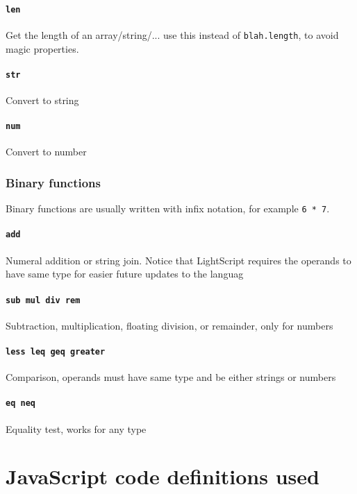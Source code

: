 \documentclass[10pt]{article}
\begin{document}
\paragraph{\tt len} Get the length of an array/string/... use this instead of \verb|blah.length|, to avoid magic properties.
\paragraph{\tt str} Convert to string
\paragraph{\tt num} Convert to number
\subsubsection{Binary functions}
Binary functions are usually written with infix notation, for example \verb|6 * 7|.
\paragraph{\tt add} Numeral addition or string join. Notice that LightScript requires the operands to have same type for easier future updates to the languag
\paragraph{\tt sub mul div rem} Subtraction, multiplication, floating division, or remainder, only for numbers
\paragraph{\tt less leq geq greater} Comparison, operands must have same type and be either strings or numbers
\paragraph{\tt eq neq} Equality test, works for any type

\section{JavaScript code definitions used}

\end{document}
